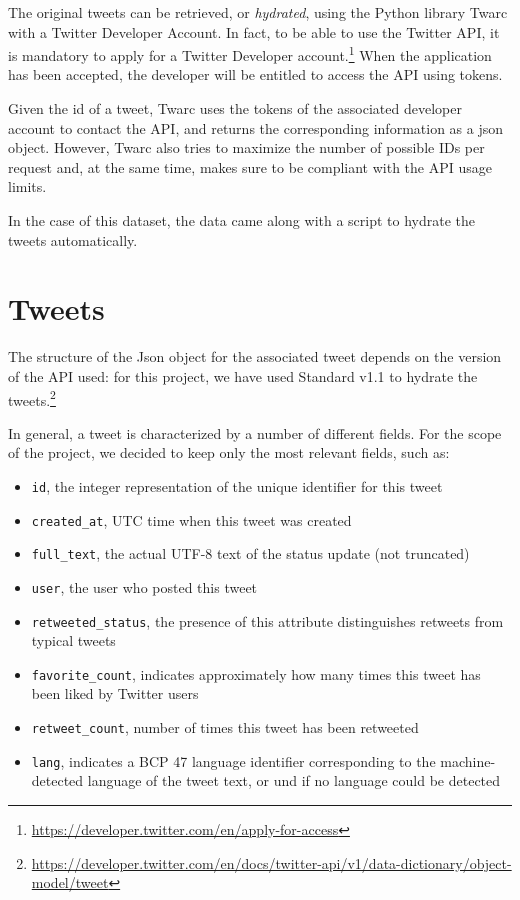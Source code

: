 The original tweets can be retrieved, or \textit{hydrated}, using the Python library Twarc with a Twitter Developer Account. In fact, to be able to use the Twitter API, it is mandatory to apply for a Twitter Developer account.\footnote{\url{https://developer.twitter.com/en/apply-for-access}} When the application has been accepted, the developer will be entitled to access the API using tokens. 

Given the id of a tweet, Twarc uses the tokens of the associated developer account to contact the API, and returns the corresponding information as a json object. However, Twarc also tries to maximize the number of possible IDs per request and, at the same time, makes sure to be compliant with the API usage limits.

In the case of this dataset, the data came along with a script to hydrate the tweets automatically.

\section{Tweets}
\label{sec:tweets}
The structure of the Json object for the associated tweet depends on the version of the API used: for this project, we have used Standard v1.1 to hydrate the tweets.\footnote{\url{https://developer.twitter.com/en/docs/twitter-api/v1/data-dictionary/object-model/tweet}}

In general, a tweet is characterized by a number of different fields. For the scope of the project, we decided to keep only the most relevant fields, such as:

\begin{itemize}
	\item \texttt{id}, the integer representation of the unique identifier for this tweet
	\item \texttt{created\_at}, UTC time when this tweet was created
	\item \texttt{full\_text}, the actual UTF-8 text of the status update (not truncated)
	\item \texttt{user}, the user who posted this tweet
	\item \texttt{retweeted\_status}, the presence of this attribute distinguishes retweets from typical tweets
	\item \texttt{favorite\_count}, indicates approximately how many times this tweet has been liked by Twitter users
	\item \texttt{retweet\_count}, number of times this tweet has been retweeted
	\item \texttt{lang}, indicates a BCP 47 language identifier corresponding to the machine-detected language of the tweet text, or und if no language could be detected
\end{itemize}

